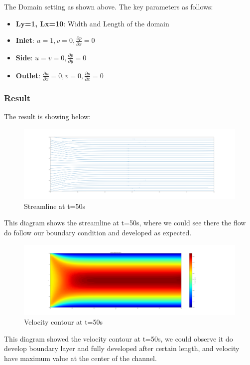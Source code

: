 \documentclass[12pt]{article}
\begin{document}
The Domain setting as shown above. The key parameters as follows:
\begin{itemize}
    \item \textbf{Ly=1, Lx=10}: Width and Length of the domain
    \item \textbf{Inlet}: $u=1, v=0, \frac{\partial p}{\partial x}=0$
    \item \textbf{Side}: $u=v=0, \frac{\partial p}{\partial y}=0$
    \item \textbf{Outlet}: $\frac{\partial u}{\partial x}=0, v=0, 
    \frac{\partial p}{\partial x}=0$
\end{itemize}


\subsubsection{Result}
The result is showing below:
\begin{figure}[H]
    \centering
    \includegraphics[width=1\linewidth]{figure/Channel_flow/cyl_stline_N=96, Re=10.0, t=50.0.jpg}
    \caption{Streamline at t=50s}
\end{figure}

This diagram shows the streamline at t=50s, where we could see there the flow do follow our boundary condition and developed as expected.

\begin{figure}[H]
    \centering
    \includegraphics[width=1.2\linewidth]{figure/Channel_flow/cyl_uv_contour_N=32, Re=10, t=10.jpg}
    \caption{Velocity contour at t=50s}
\end{figure}

This diagram showed the velocity contour at t=50s, we could observe it do develop boundary layer and fully developed after certain length, and velocity have maximum value at the center of the channel.
\end{document}
